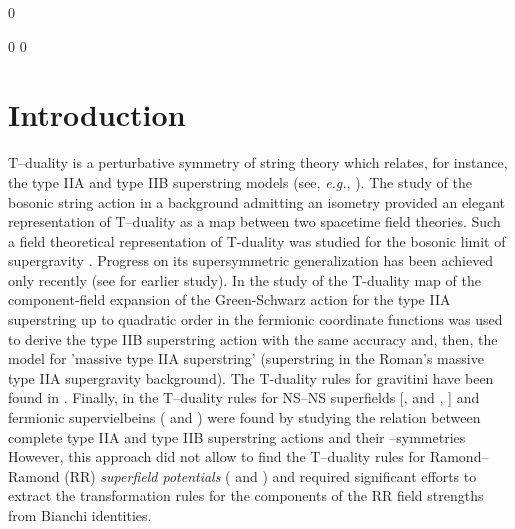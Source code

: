 \documentclass[a4paper,11pt]{article}
\begin{document}
\bigskip




\setcounter{page}0 

\newpage
\renewcommand{\thefootnote}{\arabic{footnote}}
\setcounter{footnote}0
\renewcommand{\theequation}{\arabic{section}.\arabic{equation}} 
\setcounter{equation}0



\section{Introduction}

T--duality is a perturbative symmetry of string theory which relates, 
for instance, the  
type IIA and type IIB superstring models (see, {\it e.g.}, \cite{Polch0}). 
The study of the bosonic string action in a 
background 
admitting an isometry \cite{buscher} provided an elegant representation 
of T--duality as a map between two spacetime
field theories. Such a field theoretical representation of 
T-duality was studied for the  bosonic limit of supergravity 
\cite{duff1,bho,bdr,ght,hull,lozano,myers,simon}. 
Progress on its supersymmetric generalization has been achieved only 
recently \cite{clps,hassan,kulik} (see \cite{siegel,bakas} for earlier
study). 
In \cite{clps} the study of the T-duality map of the 
component-field expansion of the Green-Schwarz action for the type IIA 
superstring up to quadratic order in the fermionic coordinate functions 
\myHighlight{$\hat{\theta}(\tau,\sigma)$}\coordHE{} 
was used to derive the type IIB superstring action with 
the same accuracy and, then, the model for 'massive type IIA superstring' 
(superstring in the Roman's massive type IIA  supergravity background). 
The T-duality rules for gravitini have been found in \cite{hassan}. 
Finally, in \cite{kulik} the  T--duality rules 
for NS--NS superfields [\coordHE{}, \coordHE{} and 
\coordHE{}, \coordHE{}] 
and fermionic supervielbeins (\coordHE{} and 
\coordHE{}) 
were found by studying the relation between complete 
type IIA and type IIB superstring actions and their \myHighlight{$\kappa$}\coordHE{}--symmetries
However, this approach did not allow to find the T--duality rules for 
Ramond--Ramond (RR) {\sl superfield potentials} 
(\coordHE{} and \coordHE{})
and required significant efforts to extract the transformation rules for the 
 components of the RR field strengths from Bianchi identities. 
\end{document}
